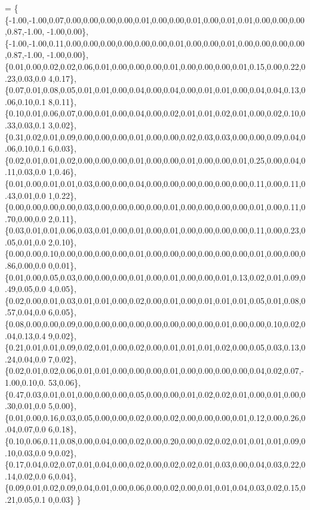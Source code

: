 \begin{DoxyCode}
= \{
        \{-1.00,-1.00,0.07,0.00,0.00,0.00,0.00,0.01,0.00,0.00,0.01,0.00,0.01,0.01,0.00,0.00,0.00,0.87,-1.00,
      -1.00,0.00\}, 
        \{-1.00,-1.00,0.11,0.00,0.00,0.00,0.00,0.00,0.00,0.01,0.00,0.00,0.01,0.00,0.00,0.00,0.00,0.87,-1.00,
      -1.00,0.00\}, 
        \{0.01,0.00,0.02,0.02,0.06,0.01,0.00,0.00,0.00,0.01,0.00,0.00,0.00,0.01,0.15,0.00,0.22,0.23,0.03,0.0
      4,0.17\}, 
        \{0.07,0.01,0.08,0.05,0.01,0.01,0.00,0.04,0.00,0.04,0.00,0.01,0.01,0.00,0.04,0.04,0.13,0.06,0.10,0.1
      8,0.11\}, 
        \{0.10,0.01,0.06,0.07,0.00,0.01,0.00,0.04,0.00,0.02,0.01,0.01,0.02,0.01,0.00,0.02,0.10,0.33,0.03,0.1
      3,0.02\}, 
        \{0.31,0.02,0.01,0.09,0.00,0.00,0.00,0.01,0.00,0.00,0.02,0.03,0.03,0.00,0.00,0.09,0.04,0.06,0.10,0.1
      6,0.03\}, 
        \{0.02,0.01,0.01,0.02,0.00,0.00,0.00,0.01,0.00,0.00,0.01,0.00,0.00,0.01,0.25,0.00,0.04,0.11,0.03,0.0
      1,0.46\}, 
        \{0.01,0.00,0.01,0.01,0.03,0.00,0.00,0.04,0.00,0.00,0.00,0.00,0.00,0.00,0.11,0.00,0.11,0.43,0.01,0.0
      1,0.22\}, 
        \{0.00,0.00,0.00,0.00,0.03,0.00,0.00,0.00,0.00,0.01,0.00,0.00,0.00,0.00,0.01,0.00,0.11,0.70,0.00,0.0
      2,0.11\}, 
        \{0.03,0.01,0.01,0.06,0.03,0.01,0.00,0.01,0.00,0.01,0.00,0.00,0.00,0.00,0.11,0.00,0.23,0.05,0.01,0.0
      2,0.10\}, 
        \{0.00,0.00,0.10,0.00,0.00,0.00,0.00,0.01,0.00,0.00,0.00,0.00,0.00,0.00,0.01,0.00,0.00,0.86,0.00,0.0
      0,0.01\}, 
        \{0.01,0.00,0.05,0.03,0.00,0.00,0.00,0.01,0.00,0.01,0.00,0.00,0.01,0.13,0.02,0.01,0.09,0.49,0.05,0.0
      4,0.05\}, 
        \{0.02,0.00,0.01,0.03,0.01,0.01,0.00,0.02,0.00,0.01,0.00,0.01,0.01,0.01,0.05,0.01,0.08,0.57,0.04,0.0
      6,0.05\}, 
        \{0.08,0.00,0.00,0.09,0.00,0.00,0.00,0.00,0.00,0.00,0.00,0.00,0.01,0.00,0.00,0.10,0.02,0.04,0.13,0.4
      9,0.02\}, 
        \{0.21,0.01,0.01,0.09,0.02,0.01,0.00,0.02,0.00,0.01,0.01,0.01,0.02,0.00,0.05,0.03,0.13,0.24,0.04,0.0
      7,0.02\}, 
        \{0.02,0.01,0.02,0.06,0.01,0.01,0.00,0.00,0.00,0.01,0.00,0.00,0.00,0.00,0.04,0.02,0.07,-1.00,0.10,0.
      53,0.06\}, 
        \{0.47,0.03,0.01,0.01,0.00,0.00,0.00,0.05,0.00,0.00,0.01,0.02,0.02,0.01,0.00,0.01,0.00,0.30,0.01,0.0
      5,0.00\}, 
        \{0.01,0.00,0.16,0.03,0.05,0.00,0.00,0.02,0.00,0.02,0.00,0.00,0.00,0.01,0.12,0.00,0.26,0.04,0.07,0.0
      6,0.18\}, 
        \{0.10,0.06,0.11,0.08,0.00,0.04,0.00,0.02,0.00,0.20,0.00,0.02,0.02,0.01,0.01,0.01,0.09,0.10,0.03,0.0
      9,0.02\}, 
        \{0.17,0.04,0.02,0.07,0.01,0.04,0.00,0.02,0.00,0.02,0.02,0.01,0.03,0.00,0.04,0.03,0.22,0.14,0.02,0.0
      6,0.04\}, 
        \{0.09,0.01,0.02,0.09,0.04,0.01,0.00,0.06,0.00,0.02,0.00,0.01,0.01,0.04,0.03,0.02,0.15,0.21,0.05,0.1
      0,0.03\} 
    \}
\end{DoxyCode}


